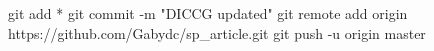 git add *
git commit -m "DICCG updated"
git remote add origin https://github.com/Gabydc/sp_article.git
git push -u origin master
